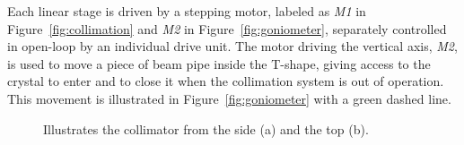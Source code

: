 Each linear stage is driven by a stepping motor, labeled as \emph{M1} in Figure~\ref{fig:collimation} and \emph{M2} in Figure~\ref{fig:goniometer}, separately controlled in open-loop by an individual drive unit. The motor driving the vertical axis, \emph{M2}, is used to move a piece of beam pipe inside the T-shape, giving access to the crystal to enter and to close it when the collimation system is out of operation. This movement is illustrated in Figure~\ref{fig:goniometer} with a green dashed line.



\begin{figure}[tpb]
  \centering %
  \qquad
  \caption{\label{fig:collimator} Illustrates the collimator from the side (a) and the top (b).}
\end{figure}


